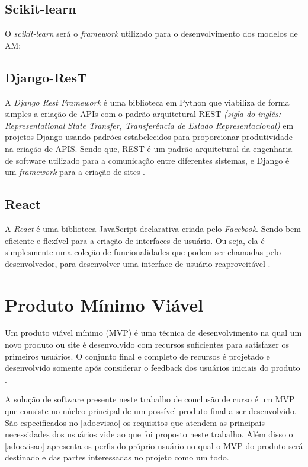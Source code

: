 \subsection{Scikit-learn}
O \textit{scikit-learn} será o \textit{framework} utilizado para o desenvolvimento dos modelos de AM;
\subsection{Django-ResT}

A \textit{Django Rest Framework} é uma biblioteca em Python que viabiliza de forma simples a criação de APIs com o padrão arquitetural REST \textit{(sigla do inglês: Representational State Transfer, Transferência de Estado Representacional)} em projetos Django usando padrões estabelecidos para proporcionar produtividade na criação de APIS. Sendo que, REST é um padrão arquitetural da engenharia de software utilizado para a comunicação entre diferentes sistemas, e Django é um \textit{framework} para a criação de sites \cite{christie2011django}.

\subsection{React}

A \textit{React} é uma biblioteca JavaScript declarativa criada pelo \textit{Facebook}. Sendo bem eficiente e flexível para a criação de interfaces de usuário. Ou seja, ela é simplesmente uma coleção de funcionalidades que podem ser chamadas pelo desenvolvedor, para desenvolver uma interface de usuário reaproveitável \cite{reactjs}.

\section{Produto Mínimo Viável}

Um produto viável mínimo (MVP) é uma técnica de desenvolvimento na qual um novo produto ou site é desenvolvido com recursos suficientes para satisfazer os primeiros usuários. O conjunto final e completo de recursos é projetado e desenvolvido somente após considerar o feedback dos usuários iniciais do produto \cite{MVP}.

A solução de software presente neste trabalho de conclusão de curso é um MVP que consiste no núcleo principal de um possível produto final a ser desenvolvido. São especificados no \ref{adocvisao} os requisitos que atendem as principais necessidades dos usuários vide ao que foi proposto neste trabalho. Além disso o \ref{adocvisao} apresenta os perfis do próprio usuário no qual o MVP do produto será destinado e das partes interessadas no projeto como um todo.
